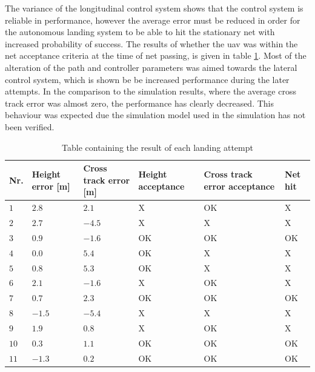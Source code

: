 The variance of the longitudinal control system shows that the control system is reliable in performance, however the average error must be reduced in order for the autonomous landing system to be able to hit the stationary net with increased probability of success. The results of whether the \gls{uav} was within the net acceptance criteria at the time of net passing, is given in table \ref{tb:Day1LandingAttempt}. Most of the alteration of the path and controller parameters was aimed towards the lateral control system, which is shown be be increased performance during the later attempts. In the comparison to the simulation results, where the average cross track error was almost zero, the performance has clearly decreased. This behaviour was expected due the simulation model used in the simulation has not been verified.
\begin{table}[H]
\centering
\begin{tabular}{| p{0.5cm} | p{1cm} | p{1cm} | p{3.5cm} | p{3cm} | p{1cm} |}
\hline
\textbf{Nr.}	& \textbf{Height error [m]}	& \textbf{Cross track error [m]}& \textbf{Height acceptance}& \textbf{Cross track error acceptance}	& \textbf{Net hit}\\ \hline
$1$				& $2.8$		& $2.1$		& X								& OK									& X					\\ \hline
$2$				& $2.7$		& $-4.5$	& X								& X										& X					\\ \hline
$3$				& $0.9$		& $-1.6$	& OK							& OK									& OK				\\ \hline
$4$				& $0.0$		& $5.4$		& OK							& X										& X					\\ \hline
$5$				& $0.8$		& $5.3$		& OK							& X										& X					\\ \hline
$6$				& $2.1$		& $-1.6$	& X								& OK									& X					\\ \hline
$7$				& $0.7$		& $2.3$		& OK							& OK									& OK				\\ \hline
$8$				& $-1.5$	& $-5.4$	& X								& X										& X					\\ \hline
$9$				& $1.9$		& $0.8$		& X								& OK									& X					\\ \hline
$10$			& $0.3$	& $1.1$		& OK							& OK									& OK				\\ \hline
$11$			& $-1.3$	& $0.2$		& OK							& OK									& OK				\\ \hline
\end{tabular}
\caption{Table containing the result of each landing attempt}
\label{tb:Day1LandingAttempt}
\end{table}
